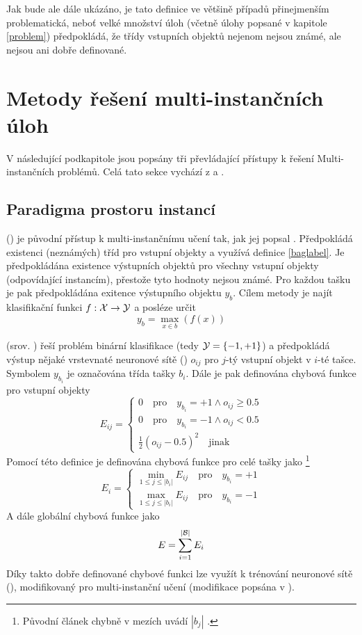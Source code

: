 Jak bude ale dále ukázáno, je tato definice ve většině případů přinejmenším problematická, neboť velké množství úloh (včetně úlohy popsané v kapitole \ref{problem}) předpokládá, že třídy vstupních objektů nejenom nejsou známé, ale nejsou ani dobře definované.

\section{Metody řešení multi-instančních úloh}

V následující podkapitole jsou popsány tři převládající přístupy k řešení Multi-instančních problémů. Celá tato sekce vychází z \cite{pevny_using_2016} a \cite{pevny_discriminative_2016}.

\subsection{Paradigma prostoru instancí}
 () je původní přístup k multi-instančnímu učení tak, jak jej popsal \cite{dietterich_solving_1997}. Předpokládá existenci (neznámých) tříd pro vstupní objekty a využívá definice \ref{baglabel}.
Je předpokládána existence výstupních objektů pro všechny vstupní objekty (odpovídající instancím), přestože tyto hodnoty nejsou známé. Pro každou tašku je pak předpokládána exitence výstupního objektu \( y_b \). Cílem metody je najít klasifikační funkci \( f : \mathcal X \to \mathcal Y \) a posléze určit
\[ y_b = \max_{x \in b} \left( f \left( x \right) \right) \]

 (srov. \cite{zhou_neural_2002}) řeší problém binární klasifikace (tedy \( \mathcal Y = \left\{ -1, +1 \right\} \)) a předpokládá výstup nějaké vrstevnaté neuronové sítě () \( o_{ij} \) pro \(j\)-tý vstupní objekt v \(i\)-té tašce. Symbolem \( y_{b_i} \) je označována třída tašky \( b_i \). Dále je pak definována chybová funkce pro vstupní objekty
\[ E_{ij} = \begin{cases}
	0 \quad \text{pro} \quad y_{b_i} = +1 \land o_{ij} \geq 0.5 \\
	0 \quad \text{pro} \quad y_{b_i} = -1 \land o_{ij} < 0.5 \\
	\frac{1}{2} \left( o_{ij} - 0.5 \right)^2 \quad \text{jinak}
\end{cases} \]
Pomocí této definice je definována chybová funkce pro celé tašky jako \footnote{Původní článek chybně v mezích uvádí \( \left| b_j \right| \) .}
\[ E_i = \begin{cases}
	\min_{1 \leq j \leq \left| b_i \right|} E_{ij} \quad \text{pro} \quad y_{b_i} = +1 \\
	\max_{1 \leq j \leq \left| b_i \right|} E_{ij} \quad \text{pro} \quad y_{b_i} = -1
\end{cases} \]
A dále globální chybová funkce jako
\[ E = \sum_{i = 1}^{\left| \mathcal B \right|} E_i \]
Díky takto dobře definované chybové funkci lze využít k trénování neuronové sítě  (), modifikovaný pro multi-instanční učení (modifikace popsána v \cite{zhou_neural_2002}).


